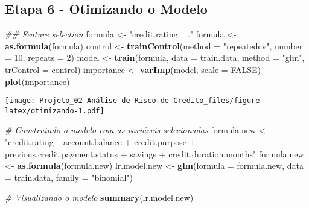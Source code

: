 \documentclass[
]{article}
\newenvironment{Shaded}{\begin{snugshade}}{\end{snugshade}}
\newcommand{\CommentTok}[1]{\textcolor[rgb]{0.56,0.35,0.01}{\textit{#1}}}
\newcommand{\DataTypeTok}[1]{\textcolor[rgb]{0.13,0.29,0.53}{#1}}
\newcommand{\DecValTok}[1]{\textcolor[rgb]{0.00,0.00,0.81}{#1}}
\newcommand{\KeywordTok}[1]{\textcolor[rgb]{0.13,0.29,0.53}{\textbf{#1}}}
\newcommand{\NormalTok}[1]{#1}
\newcommand{\OtherTok}[1]{\textcolor[rgb]{0.56,0.35,0.01}{#1}}
\newcommand{\StringTok}[1]{\textcolor[rgb]{0.31,0.60,0.02}{#1}}
\begin{document}
\hypertarget{etapa-6---otimizando-o-modelo}{%
\subsection{Etapa 6 - Otimizando o
Modelo}\label{etapa-6---otimizando-o-modelo}}

\begin{Shaded}
\begin{Highlighting}[]
\CommentTok{## Feature selection}
\NormalTok{formula <-}\StringTok{ "credit.rating ~ ."}
\NormalTok{formula <-}\StringTok{ }\KeywordTok{as.formula}\NormalTok{(formula)}
\NormalTok{control <-}\StringTok{ }\KeywordTok{trainControl}\NormalTok{(}\DataTypeTok{method =} \StringTok{"repeatedcv"}\NormalTok{, }\DataTypeTok{number =} \DecValTok{10}\NormalTok{, }\DataTypeTok{repeats =} \DecValTok{2}\NormalTok{)}
\NormalTok{model <-}\StringTok{ }\KeywordTok{train}\NormalTok{(formula, }\DataTypeTok{data =}\NormalTok{ train.data, }\DataTypeTok{method =} \StringTok{"glm"}\NormalTok{, }\DataTypeTok{trControl =}\NormalTok{ control)}
\NormalTok{importance <-}\StringTok{ }\KeywordTok{varImp}\NormalTok{(model, }\DataTypeTok{scale =} \OtherTok{FALSE}\NormalTok{)}
\KeywordTok{plot}\NormalTok{(importance)}
\end{Highlighting}
\end{Shaded}

\texttt{[image: Projeto\_02---Análise-de-Risco-de-Credito\_files/figure-latex/otimizando-1.pdf]}

\begin{Shaded}
\begin{Highlighting}[]
\CommentTok{# Construindo o modelo com as variáveis selecionadas}
\NormalTok{formula.new <-}\StringTok{ "credit.rating ~ account.balance + credit.purpose + previous.credit.payment.status + savings + credit.duration.months"}
\NormalTok{formula.new <-}\StringTok{ }\KeywordTok{as.formula}\NormalTok{(formula.new)}
\NormalTok{lr.model.new <-}\StringTok{ }\KeywordTok{glm}\NormalTok{(}\DataTypeTok{formula =}\NormalTok{ formula.new, }\DataTypeTok{data =}\NormalTok{ train.data, }\DataTypeTok{family =} \StringTok{"binomial"}\NormalTok{)}

\CommentTok{# Visualizando o modelo}
\KeywordTok{summary}\NormalTok{(lr.model.new)}
\end{Highlighting}
\end{Shaded}
\end{document}
